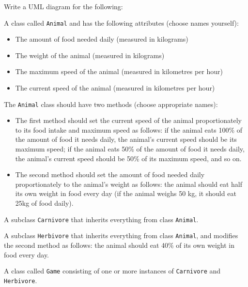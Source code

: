Write a UML diagram for the following:

A class called \texttt{Animal} and has the following attributes (choose names yourself): 
\begin{itemize}
\item The amount of food needed daily (measured in kilograms)
\item The weight of the animal (measured in kilograms)
\item The maximum speed of the animal (measured in kilometres per hour)
\item The current speed of the animal (measured in kilometres per hour)
\end{itemize}
The \texttt{Animal} class should have two methods (choose appropriate names):
\begin{itemize}
\item The first method should set the current speed of the animal proportionately to its food intake and maximum speed as follows: if the animal eats 100\% of the amount of food it needs daily, the animal's current speed should be its maximum speed; if the animal eats 50\% of the amount of food it needs daily, the animal's current speed should be 50\% of its maximum speed, and so on.
\item The second method should set the amount of food needed daily proportionately to the animal's weight as follows: the animal should eat half its own weight in food every day (if the animal weighs 50 kg, it should eat 25kg of food daily).
\end{itemize}

A subclass \texttt{Carnivore} that inherits everything from class \texttt{Animal}.

A subclass \texttt{Herbivore} that inherits everything from class \texttt{Animal}, and modifies the second method as follows: the animal should eat 40\% of its own weight in food every day.

A class called \texttt{Game} consisting of one or more instances of \texttt{Carnivore} and \texttt{Herbivore}.